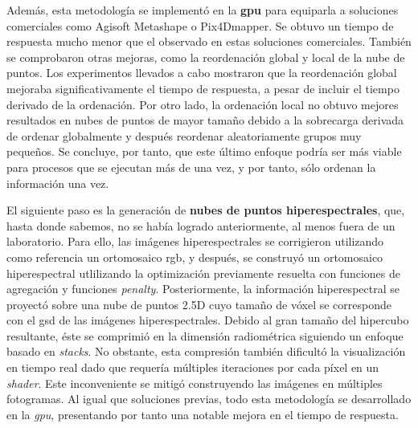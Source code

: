 Además, esta metodología se implementó en la \textbf{\acrshort{gpu}} para equiparla a soluciones comerciales como Agisoft Metashape o Pix4Dmapper. Se obtuvo un tiempo de respuesta mucho menor que el observado en estas soluciones comerciales. También se comprobaron otras mejoras, como la reordenación global y local de la nube de puntos. Los experimentos llevados a cabo mostraron que la reordenación global mejoraba significativamente el tiempo de respuesta, a pesar de incluir el tiempo derivado de la ordenación. Por otro lado, la ordenación local no obtuvo mejores resultados en nubes de puntos de mayor tamaño debido a la sobrecarga derivada de ordenar globalmente y después reordenar aleatoriamente grupos muy pequeños. Se concluye, por tanto, que este último enfoque podría ser más viable para procesos que se ejecutan más de una vez, y por tanto, sólo ordenan la información una vez.

El siguiente paso es la generación de \textbf{nubes de puntos hiperespectrales}, que, hasta donde sabemos, no se había logrado anteriormente, al menos fuera de un laboratorio. Para ello, las imágenes hiperespectrales se corrigieron utilizando como referencia un ortomosaico \acrshort{rgb}, y después, se construyó un ortomosaico hiperespectral utlilizando la optimización previamente resuelta con funciones de agregación y funciones \textit{penalty}. Posteriormente, la información hiperespectral se proyectó sobre una nube de puntos 2.5D cuyo tamaño de vóxel se corresponde con el \acrshort{gsd} de las imágenes hiperespectrales. Debido al gran tamaño del hipercubo resultante, éste se comprimió en la dimensión radiométrica siguiendo un enfoque basado en \textit{stacks}. No obstante, esta compresión también dificultó la visualización en tiempo real dado que requería múltiples iteraciones por cada píxel en un \textit{shader}. Este inconveniente se mitigó construyendo las imágenes en múltiples fotogramas. Al igual que soluciones previas, todo esta metodología se desarrollado en la \textit{gpu}, presentando por tanto una notable mejora en el tiempo de respuesta.


